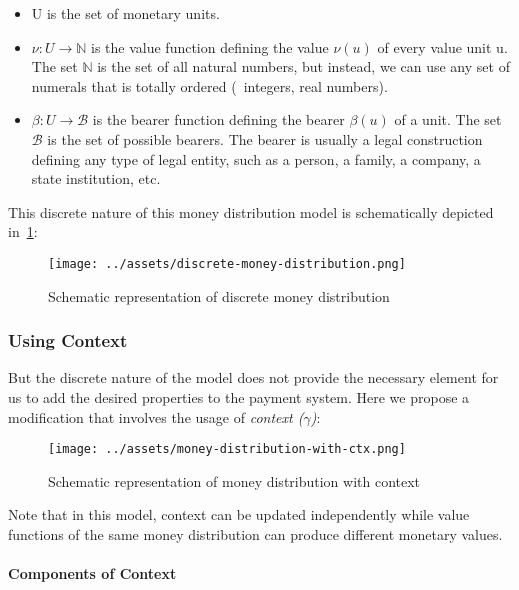 \begin{itemize}
    \item U is the set of monetary units.

    \item $\nu : U \rightarrow \mathbb{N}$ is the value function defining the value $\nu(u)$ of
every value unit u. The set $\mathbb{N}$ is the set of all natural numbers, but instead, we can use
any set of numerals that is totally ordered (\eg\ integers, real numbers).

    \item $\beta : U \rightarrow \mathcal{B}$ is the bearer function defining the bearer $\beta(u)$
of a unit. The set $\mathcal{B}$ is the set of possible bearers. The bearer is usually a legal
construction defining any type of legal entity, such as a person, a family, a company, a state
institution, etc.
\end{itemize}

This discrete nature of this money distribution model is schematically depicted
in~\ref{fig:discrete-md}:

\begin{figure}[h]
    \centering
    \texttt{[image: ../assets/discrete-money-distribution.png]}
    \caption{Schematic representation of discrete money distribution}
    \label{fig:discrete-md}
\end{figure}

\subsubsection{Using Context}

But the discrete nature of the model does not provide the necessary element for us to add the
desired properties to the payment system. Here we propose a modification that involves the usage
of \textit{context ($\gamma$)}:

\begin{figure}[h]
    \centering
    \texttt{[image: ../assets/money-distribution-with-ctx.png]}
    \caption{Schematic representation of money distribution with context}
    \label{fig:md-with-ctx}
\end{figure}

Note that in this model, context can be updated independently while value functions of the same
money distribution can produce different monetary values.

\paragraph{Components of Context}

